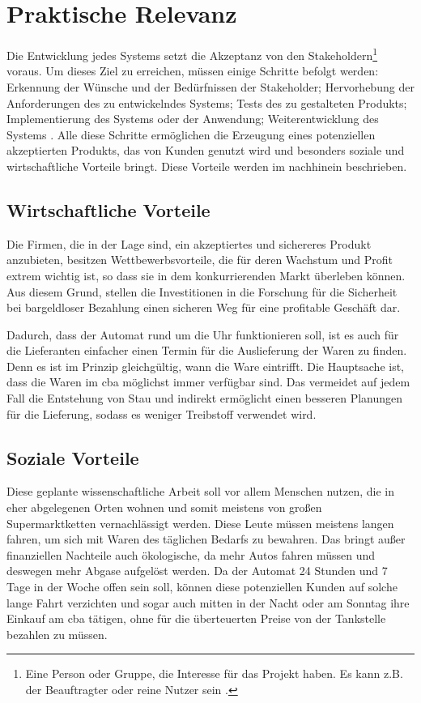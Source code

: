 \section{Praktische Relevanz}

Die Entwicklung jedes Systems setzt die Akzeptanz von den Stakeholdern\footnote{Eine Person oder Gruppe, die Interesse 
für das Projekt haben. Es kann z.B. der Beauftragter oder reine Nutzer sein \cite{refip:HSSI}.} voraus. Um dieses Ziel 
zu erreichen, müssen einige Schritte befolgt werden: Erkennung der Wünsche und der Bedürfnissen der Stakeholder; Hervorhebung 
der Anforderungen des zu entwickelndes Systems; Tests des zu gestalteten Produkts; Implementierung des Systems oder 
der Anwendung; Weiterentwicklung des Systems \cite{refbook:RECR}. Alle diese Schritte ermöglichen die Erzeugung eines 
potenziellen akzeptierten Produkts, das von Kunden genutzt wird und besonders soziale und wirtschaftliche Vorteile bringt.
Diese Vorteile werden im nachhinein beschrieben.


\subsection{Wirtschaftliche Vorteile}

Die Firmen, die in der Lage sind, ein akzeptiertes und sichereres Produkt anzubieten, besitzen Wettbewerbsvorteile, 
die für deren Wachstum und Profit extrem wichtig ist, so dass sie in dem konkurrierenden Markt überleben können. Aus 
diesem Grund, stellen die Investitionen in die Forschung für die Sicherheit bei bargeldloser Bezahlung einen sicheren 
Weg für eine profitable Geschäft dar.


Dadurch, dass der Automat rund um die Uhr funktionieren soll, ist es auch für die Lieferanten einfacher einen Termin 
für die Auslieferung der Waren zu finden. Denn es ist im Prinzip gleichgültig, wann die Ware eintrifft. Die Hauptsache 
ist, dass die Waren im \acrshort{cba} möglichst immer verfügbar sind. Das vermeidet auf jedem Fall die Entstehung von 
Stau und indirekt ermöglicht einen besseren Planungen  für die Lieferung, sodass es weniger Treibstoff verwendet wird.


\subsection{Soziale Vorteile}

Diese geplante wissenschaftliche Arbeit soll vor allem Menschen nutzen, die in eher abgelegenen Orten wohnen und somit 
meistens von großen Supermarktketten vernachlässigt werden. Diese Leute müssen meistens langen fahren, um sich mit
Waren des täglichen Bedarfs zu bewahren. Das bringt außer finanziellen Nachteile auch ökologische, da mehr Autos fahren 
müssen und deswegen mehr Abgase aufgelöst werden. Da der Automat 24 Stunden und 7 Tage in der Woche offen sein soll,
können diese potenziellen Kunden auf solche lange Fahrt verzichten und sogar auch mitten in der Nacht oder am Sonntag
ihre Einkauf am \acrshort{cba} tätigen, ohne für die überteuerten Preise von der Tankstelle bezahlen zu müssen. 

